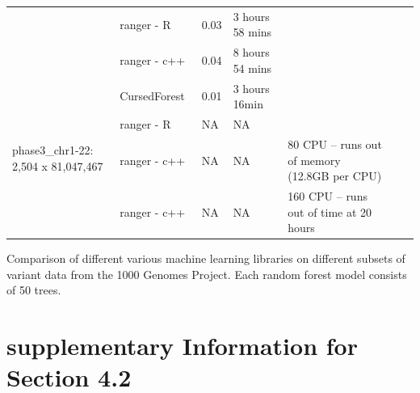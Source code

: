 \documentclass[11pt]{article}
\newcommand{\cursedforest}{{\sc CursedForest}}
\begin{document}
\begin{table}
\begin{minipage}{\textwidth}
\begin{tabular}{|l|l|l|l|l|l|p{1cm}|}
  						 & ranger - R      & 0.03      &    3 hours 58 mins  &   \\ %
						& ranger - c++ & 0.04 & 8 hours 54 mins &  \\ %
\hline
\multirow{4}{*}{phase3\_chr1-22: 2,504 x 81,047,467} & \cursedforest\ & 0.01  & 3 hours 16min & \\%
										& ranger - R       &        NA     &        NA   & \\
										& ranger - c++       &        NA     &        NA     &            80 CPU -- runs out of memory (12.8GB per CPU) \\
										& ranger - c++       &        NA     &        NA     &            160 CPU -- runs out of time at 20 hours \\
\hline
\end{tabular}
\begin{flushleft} 
Comparison of different various machine learning libraries on different subsets of variant data 
from the 1000 Genomes Project.
Each random forest model consists of 50 trees.
\end{flushleft}
\label{table1}
\end{minipage}
\end{table}

\clearpage
\newpage

\section{supplementary Information for Section 4.2}
\end{document}
